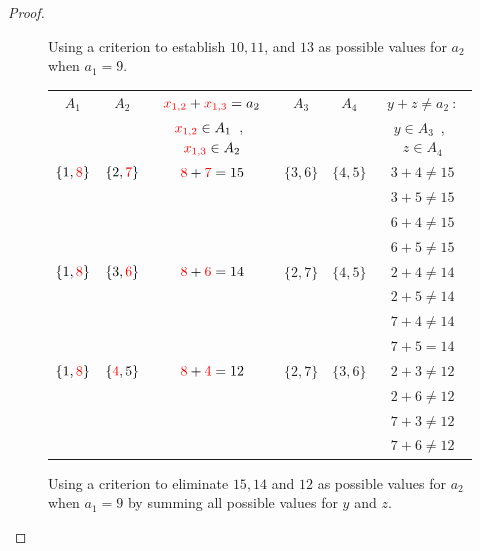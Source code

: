 \documentclass[10pt,a4paper]{amsart}
\begin{document}
\begin{proof}
\begin{figure}[hbt!]
    \caption{Using a criterion to establish $10, 11$, and $13$ as possible values for $a_2$ when $a_1=9$.}
    \label{establish_a2_values}
\end{figure}

\begin{figure}[hbt!]
\centering
\renewcommand{\arraystretch}{1.5}
\begin{tabular}{|c|c|c|c|c|c|} \hline
$A_1$ & $A_2$  & $\textcolor{red}{x_{1,2}}+\textcolor{red}{x_{1,3}}=a_2$ & $A_3$ &  $A_4$ & $y+z\neq a_2\ :$\\ 
      &            &   $\textcolor{red}{x_{1,2}}\in A_1$\ ,\ $\textcolor{red}{x_{1,3}}\in A_2$                                     &      &    &
$y\in A_3$\ ,\ $z\in A_4$ \\  \hline     
$\{1, \textcolor{red}{8}\}$ & $\{2,\textcolor{red}{7}\}$ & $\textcolor{red}{8}+\textcolor{red}{7}=15$ & $\{ 3,6\}$ &  $\{ 4, 5  \}$ &  $3+4\neq 15$\\ 
          &     &          &            &                 & $3+5\neq 15$\\ 
          &     &          &            &                 & $6+4\neq 15$\\   &     &          &            &                 & $6+5\neq 15$\\  \hline     
 $\{1, \textcolor{red}{8}\}$& $\{3,\textcolor{red}{6}\}$ & $\textcolor{red}{8}+\textcolor{red}{6}=14$ & $\{ 2,7\}$ &  $\{ 4, 5  \}$ &  $2+4\neq 14$\\ 
          &     &          &            &                 & $2+5\neq 14$\\ 
          &     &          &            &                 & $7+4\neq 14$\\   &     &          &            &                 & $7+5=14$\\     \hline
$\{1, \textcolor{red}{8}\}$ & $\{\textcolor{red}{4},5\}$ & $\textcolor{red}{8}+\textcolor{red}{4}=12$ & $\{ 2,7\}$ &  $\{ 3, 6  \}$ &  $2+3\neq 12$\\ 
          &     &          &            &                 & $2+6\neq 12$\\ 
          &     &          &            &                 & $7+3\neq 12$\\   &     &          &            &                 & $7+6\neq 12$\\     \hline          
\end{tabular}
\caption{Using a criterion to eliminate $15, 14$ and $12$ as possible values for $a_2$ when $a_1=9$ by summing all possible values for $y$ and $z$.}
\label{eliminate_a2_values}    
\end{figure}


\end{proof}
\end{document}
